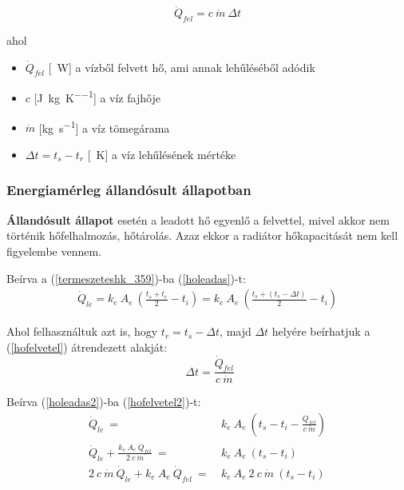 \begin{equation} \label{hofelvetel}
\dot Q_{fel} = c ~ \dot{m} ~ \Delta t
\end{equation}

ahol

\begin{itemize}[itemsep=6pt,topsep=0pt,parsep=0pt,partopsep=0pt]
	\item[] $\dot{Q}_{fel}$ [\SI{}{\watt}] a vízből felvett hő, ami annak lehűléséből adódik
	\item[] $c$ [\si[per-mode = fraction]{\joule\per\kg\per\kelvin}] a víz fajhője
	\item[] $\dot{m}$ [\si[per-mode = fraction]{\kg\per\second}] a víz tömegárama
	\item[] $\Delta t = t_s-t_r$ [\SI{}{\kelvin}] a víz lehűlésének mértéke
\end{itemize}

\subsubsection{Energiamérleg állandósult állapotban}
\textbf{Állandósult állapot} esetén a leadott hő egyenlő a felvettel, mivel akkor nem történik hőfelhalmozás, hőtárolás.
Azaz ekkor a radiátor hőkapacitását nem kell figyelembe vennem.

Beírva a (\ref{termeszeteshk_359})-ba (\ref{holeadas})-t:
\begin{equation} \label{holeadas2}
\begin{aligned}
\dot Q_{le} = k_e ~ A_e ~ \left( \frac{t_s+t_r}{2}-t_i\right) = k_e ~ A_e ~ \left( \frac{t_s+(t_s-\Delta t)}{2}-t_i\right)
\end{aligned}
\end{equation}

Ahol felhasználtuk azt is, hogy $t_r = t_s-\Delta t$, majd $\Delta t$ helyére beírhatjuk a (\ref{hofelvetel})  átrendezett alakját:
\begin{equation} \label{hofelvetel2}
~~\Delta t = \frac{\dot Q_{fel}}{c ~ \dot{m}}
\end{equation}

Beírva (\ref{holeadas2})-ba (\ref{hofelvetel2})-t:
\begin{equation} \label{holeadas3}
\begin{aligned}
\dot Q_{le} ~=~ & k_e ~ A_e ~ \left( t_s-t_i-\frac{\dot Q_{fel}}{c ~ \dot{m}}\right)  \\[18pt]
\dot Q_{le} + \frac{k_e ~ A_e ~ \dot Q_{fel}}{2 ~ c ~ \dot{m}} ~ = ~ & k_e ~ A_e ~(t_s-t_i) \\[24pt]
2 ~ c ~ \dot{m} ~ \dot Q_{le} + k_e ~ A_e ~ \dot Q_{fel} ~ = ~ &  k_e ~ A_e ~ 2~ c~ \dot{m} ~(t_s-t_i)
\end{aligned}
\end{equation}


